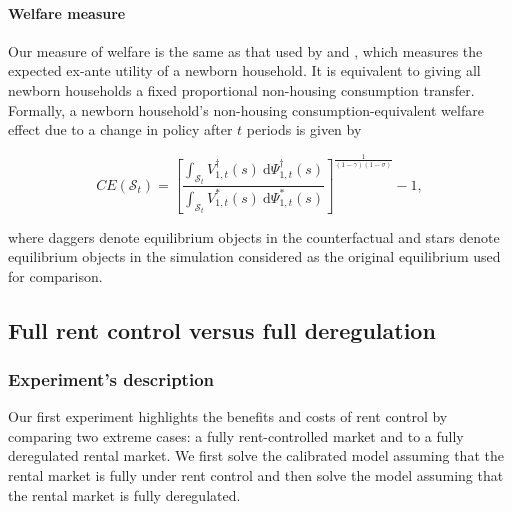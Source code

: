 \documentclass[parskip=full]{article}
\begin{document}
\paragraph{Welfare measure} Our measure of welfare is the same as that used by \citet{conesa-et-al} and \citet{gkkoc}, which measures the expected ex-ante utility of a newborn household. It is equivalent to giving all newborn households a fixed proportional non-housing consumption transfer. Formally, a newborn household's non-housing consumption-equivalent welfare effect due to a change in policy after $t$ periods is given by

\begin{equation*}
  CE(\mathcal{S}_{t}) = \left[\frac{\int_{\mathcal{S}_{t}}V^{\dagger}_{1,t}(s)\ \mathrm{d}\Psi^{\dagger}_{1,t}(s)}{\int_{\mathcal{S}_{t}}V^*_{1,t}(s)\ \mathrm{d}\Psi^*_{1,t}(s)}\right]^{\frac{1}{(1-\gamma)(1-\sigma)}}-1,
\end{equation*}

\noindent where daggers denote equilibrium objects in the counterfactual and stars denote equilibrium objects in the simulation considered as the original equilibrium used for comparison. 

\subsection{Full rent control versus full deregulation}

\subsubsection{Experiment's description} Our first experiment highlights the benefits and costs of rent control by comparing two extreme cases: a fully rent-controlled market and to a fully deregulated rental market. We first solve the calibrated model assuming that the rental market is fully under rent control and then solve the model assuming that the rental market is fully deregulated. 
\end{document}
